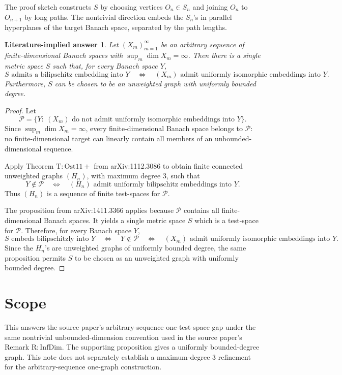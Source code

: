 \documentclass[11pt]{amsart}
\newtheorem*{theorem*}{Literature-implied answer}
\begin{document}
The proof sketch constructs \(S\) by choosing vertices \(O_n\in S_n\) and
joining \(O_n\) to \(O_{n+1}\) by long paths. The nontrivial direction embeds
the \(S_n\)'s in parallel hyperplanes of the target Banach space, separated by
the path lengths.

\begin{theorem*}
Let \((X_m)_{m=1}^{\infty}\) be an arbitrary sequence of finite-dimensional
Banach spaces with \(\sup_m \dim X_m=\infty\). Then there is a single metric
space \(S\) such that, for every Banach space \(Y\),
\[
  S \text{ admits a bilipschitz embedding into } Y
  \quad\Longleftrightarrow\quad
  (X_m) \text{ admit uniformly isomorphic embeddings into } Y.
\]
Furthermore, \(S\) can be chosen to be an unweighted graph with uniformly
bounded degree.
\end{theorem*}

\begin{proof}
Let
\[
  \mathcal P=\{Y:\ (X_m) \text{ do not admit uniformly isomorphic embeddings
  into } Y\}.
\]
Since \(\sup_m\dim X_m=\infty\), every finite-dimensional Banach space belongs
to \(\mathcal P\): no finite-dimensional target can linearly contain all
members of an unbounded-dimensional sequence.

Apply Theorem \(\mathrm{T:Ost11+}\) from arXiv:1112.3086 to obtain finite
connected unweighted graphs \((H_n)\), with maximum degree \(3\), such that
\[
  Y\notin \mathcal P
  \quad\Longleftrightarrow\quad
  (H_n) \text{ admit uniformly bilipschitz embeddings into } Y.
\]
Thus \((H_n)\) is a sequence of finite test-spaces for \(\mathcal P\).

The proposition from arXiv:1411.3366 applies because \(\mathcal P\) contains
all finite-dimensional Banach spaces. It yields a single metric space \(S\)
which is a test-space for \(\mathcal P\). Therefore, for every Banach space
\(Y\),
\[
  S \text{ embeds bilipschitzly into } Y
  \quad\Longleftrightarrow\quad
  Y\notin\mathcal P
  \quad\Longleftrightarrow\quad
  (X_m) \text{ admit uniformly isomorphic embeddings into } Y.
\]
Since the \(H_n\)'s are unweighted graphs of uniformly bounded degree, the
same proposition permits \(S\) to be chosen as an unweighted graph with
uniformly bounded degree.
\end{proof}

\section*{Scope}

This answers the source paper's arbitrary-sequence one-test-space gap under
the same nontrivial unbounded-dimension convention used in the source paper's
Remark \(\mathrm{R:InfDim}\). The supporting proposition gives a uniformly
bounded-degree graph. This note does not separately establish a maximum-degree
\(3\) refinement for the arbitrary-sequence one-graph construction.
\end{document}
